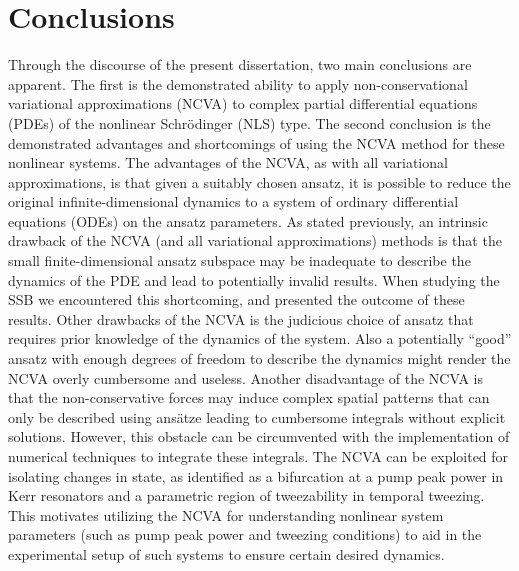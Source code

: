 \chapter{Conclusions}
\label{chap:conclusion}

Through the discourse of the present dissertation, two main conclusions are apparent.  The first is the demonstrated ability to apply non-conservational variational approximations (NCVA) to complex partial differential equations (PDEs) of the nonlinear Schr\"{o}dinger (NLS) type.  The second conclusion is the demonstrated advantages and shortcomings of using the NCVA method for these nonlinear systems.  The advantages of the NCVA, as with all variational approximations, is that given a suitably chosen ansatz,
it is possible to reduce the original infinite-dimensional dynamics to
a system of ordinary differential equations (ODEs) on the ansatz parameters.  As stated previously, an intrinsic drawback of the NCVA (and all variational approximations) methods is that the small finite-dimensional ansatz subspace may be inadequate to describe the dynamics of the PDE and lead to potentially invalid results.  When studying the SSB we encountered this shortcoming, and presented the outcome of these results.  Other drawbacks of the NCVA is the judicious choice of ansatz that requires prior knowledge of the dynamics of the system.  Also a potentially ``good'' ansatz with enough degrees of freedom to describe the dynamics might render the NCVA overly cumbersome and useless.  Another disadvantage of the NCVA is that the non-conservative forces may induce complex spatial patterns that can only be described using ans\"atze leading to cumbersome integrals without explicit solutions.  However, this obstacle can be circumvented with the implementation of numerical techniques to integrate these integrals.  The NCVA can be exploited for isolating changes in state, as identified as a bifurcation at a pump peak power in Kerr resonators and a parametric region of tweezability in temporal tweezing.  This motivates utilizing the NCVA for understanding nonlinear system parameters (such as pump peak power and tweezing conditions) to aid in the experimental setup of such systems to ensure certain desired dynamics.



